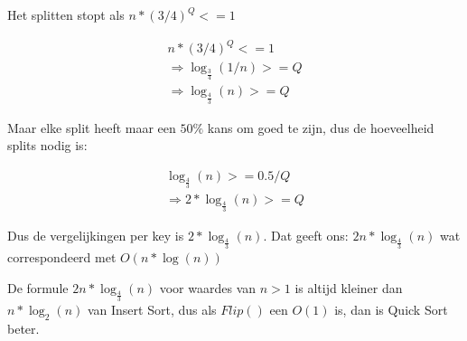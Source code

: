 Het splitten stopt als $n*(3/4)^Q <= 1$

\begin{align*}
n*(3/4)^Q <= 1  \\
\Rightarrow \log_{\frac{3}{4}}(1/n) >= Q \\
\Rightarrow \log_{\frac{4}{3}}(n) >= Q
\end{align*}

Maar elke split heeft maar een $50\%$ kans om goed te zijn, dus de hoeveelheid splits nodig is:

\begin{align*}
\log_{\frac{4}{3}}(n) >= 0.5 / Q \\
\Rightarrow 2 * \log_{\frac{4}{3}}(n) >= Q
\end{align*}

Dus de vergelijkingen per key is $2*\log_{\frac{4}{3}}(n)$.
Dat geeft ons: $2n * \log_{\frac{4}{3}}(n)$ wat correspondeerd met $O(n*\log(n))$


De formule $2n * \log_{\frac{4}{3}}(n)$ voor waardes van $n > 1$ is altijd kleiner dan $n * \log_{2}(n)$ van Insert Sort, dus als $Flip()$ een $O(1)$ is, dan is Quick Sort beter.